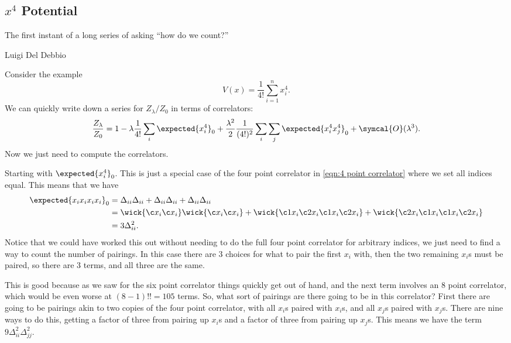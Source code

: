 \documentclass[fleqn]{NotesClass}
\newcommand{\order}{\symcal{O}}
\begin{document}
    \subsection{\texorpdfstring{\(x^4\)}{x to the four} Potential}
    \epigraph{The first instant of a long series of asking \enquote{how do we count?}}{Luigi Del Debbio}
    Consider the example
    \begin{equation}
        V(x) = \frac{1}{4!} \sum_{i = 1}^n x_i^4.
    \end{equation}
    We can quickly write down a series for \(Z_\lambda/Z_0\) in terms of correlators:
    \begin{equation}
        \frac{Z_\lambda}{Z_0} = 1 - \lambda \frac{1}{4!} \sum_i \expected{x_i^4}_0 + \frac{\lambda^2}{2}\frac{1}{(4!)^2} \sum_i \sum_j \expected{x_i^4 x_j^4}_0 + \order(\lambda^3).
    \end{equation}
    Now we just need to compute the correlators.
    
    Starting with \(\expected{x_i^4}_0\).
    This is just a special case of the four point correlator in \cref{eqn:4 point correlator} where we set all indices equal.
    This means that we have
    \begin{align}
        \expected{x_ix_ix_ix_i}_0 &= \Delta_{ii}\Delta_{ii} + \Delta_{ii}\Delta_{ii} + \Delta_{ii}\Delta_{ii}\\
        &= \wick{\c x_i \c x_i} \wick{\c x_i \c x_i} + \wick{\c1 x_i \c2 x_i \c1 x_i \c2 x_i} + \wick{\c2 x_i \c1 x_i \c1 x_i \c2 x_i}\\
        &= 3 \Delta_{ii}^2.
    \end{align}
    Notice that we could have worked this out without needing to do the full four point correlator for arbitrary indices, we just need to find a way to count the number of pairings.
    In this case there are 3 choices for what to pair the first \(x_i\) with, then the two remaining \(x_i\)s must be paired, so there are 3 terms, and all three are the same.
    
    This is good because as we saw for the six point correlator things quickly get out of hand, and the next term involves an 8 point correlator, which would be even worse at \((8 - 1)!! = 105\) terms.
    So, what sort of pairings are there going to be in this correlator?
    First there are going to be pairings akin to two copies of the four point correlator, with all \(x_i\)s paired with \(x_i\)s, and all \(x_j\)s paired with \(x_j\)s.
    There are nine ways to do this, getting a factor of three from pairing up \(x_i\)s and a factor of three from pairing up \(x_j\)s.
    This means we have the term \(9\Delta_{ii}^2\Delta_{jj}^2\).
    
\end{document}
